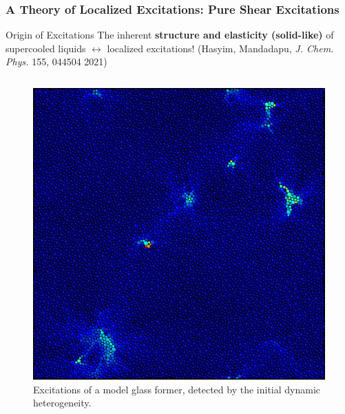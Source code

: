 \begin{frame}[c]\label{b.1}
\frametitle{A Theory of Localized Excitations: Pure Shear Excitations}

\begin{block}{\centering \large Origin of Excitations }
\centering The inherent \textbf{structure and elasticity (solid-like)} of supercooled liquids $\leftrightarrow$ localized excitations! {\footnotesize (Hasyim, Mandadapu,  \textit{J. Chem. Phys.} 155, 044504 2021)}
\end{block}
\vspace{-0.5em}
\begin{columns}[T]
\begin{column}[T]{0.4\textwidth}

\begin{figure}[t]

\begin{overprint}

\centering\includegraphics[width=0.85\linewidth]{b.1-exc_pureshear/zoomout_dispmag.png}\caption{Excitations of a model glass former, detected by the initial dynamic heterogeneity.}


\end{overprint}
\end{figure}
\end{column}
\end{columns}
\end{frame}
